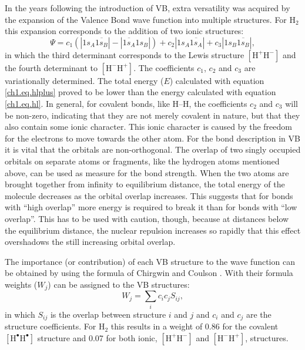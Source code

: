 In the years following the introduction of VB, extra versatility was acquired by the expansion of the Valence Bond wave function into multiple structures. For H$_2$ this expansion corresponds to the addition of two ionic structures:
\begin{equation}
\Psi = c_1 (|1s_{A}\overline{1s_{B}}| - |\overline{1s_{A}}1s_{B}|) + c_2 |1s_{A}\overline{1s_{A}}| + c_3 |1s_{B}\overline{1s_{B}}|,
\label{ch1.eq.hlplus}
\end{equation}
in which the third determinant corresponds to the Lewis structure $\mathrm{[H^{+} H^{-}]}$ and the fourth determinant to $\mathrm{[H^{-} H^{+}]}$. The coefficients $c_1$, $c_2$ and $c_3$ are variationally determined. The total energy ($E$) calculated with equation \ref{ch1.eq.hlplus} proved to be lower than the energy calculated with equation \ref{ch1.eq.hl}. In general, for covalent bonds, like H--H, the coefficients $c_2$ and $c_3$ will be non-zero, indicating that they are not merely covalent in nature, but that they also contain some ionic character. This ionic character is caused by the freedom for the electrons to move towards the other atom. For the bond description in VB it is vital that the orbitals are non-orthogonal. The overlap of two singly occupied orbitals on separate atoms or fragments, like the hydrogen atoms mentioned above, can be used as measure for the bond strength. When the two atoms are brought together from infinity to equilibrium distance, the total energy of the molecule decreases as the orbital overlap increases. This suggests that for bonds with ``high overlap'' more energy is required to break it than for bonds with ``low overlap''. This has to be used with caution, though, because at distances below the equilibrium distance, the nuclear repulsion increases so rapidly that this effect overshadows the still increasing orbital overlap.

The importance (or contribution) of each VB structure to the wave function can be obtained by using the formula of Chirgwin and Coulson \cite{chirgwin}. With their formula weights ($W_j$) can be assigned to the VB structures:
\begin{equation}
W_{j}=\sum_{i} c_{i}c_{j}S_{ij},
\label{ch1.eq.weight}
\end{equation}
in which $S_{ij}$ is the overlap between structure $i$ and $j$ and $c_i$ and $c_j$ are the structure coefficients. For H$_2$ this results in a weight of 0.86 for the covalent $\mathrm{[H^\bullet H^\bullet]}$ structure and 0.07 for both ionic, $\mathrm{[H^{+} H^{-}]}$ and $\mathrm{[H^{-} H^{+}]}$, structures. 

